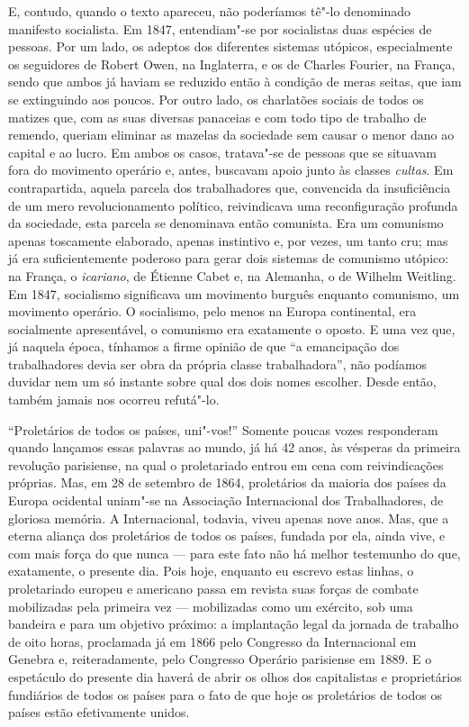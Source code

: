 E, contudo, quando o texto apareceu, não poderíamos tê"-lo denominado
manifesto socialista. Em 1847, entendiam"-se por socialistas duas
espécies de pessoas. Por um lado, os adeptos dos diferentes sistemas
utópicos, especialmente os seguidores de Robert Owen, na Inglaterra, e os
de Charles Fourier, na França, sendo que ambos já haviam se reduzido
então à condição de meras seitas, que iam se extinguindo aos poucos.
Por outro lado, os charlatões sociais de todos os matizes que, com as
suas diversas panaceias e com todo tipo de trabalho de remendo, queriam
eliminar as mazelas da sociedade sem causar o menor dano ao capital e
ao lucro. Em ambos os casos, tratava"-se de pessoas que se situavam
fora do movimento operário e, antes, buscavam apoio junto às classes
\textit{cultas}. Em contrapartida, aquela parcela dos trabalhadores que,
convencida da insuficiência de um mero revolucionamento político,
reivindicava uma reconfiguração profunda da sociedade, esta parcela se
denominava então comunista. Era um comunismo apenas toscamente
elaborado, apenas instintivo e, por vezes, um tanto cru; mas já era
suficientemente poderoso para gerar dois sistemas de comunismo utópico:
na França, o \textit{icariano}, de Étienne Cabet e, na Alemanha, o de Wilhelm
Weitling. Em 1847, socialismo significava um movimento burguês enquanto
comunismo, um movimento operário. O socialismo, pelo menos na Europa
continental, era socialmente apresentável, o comunismo era exatamente o
oposto. E uma vez que, já naquela época, tínhamos a firme opinião de
que ``a emancipação dos trabalhadores devia ser obra da própria classe
trabalhadora'', não podíamos duvidar nem um só instante sobre qual dos
dois nomes escolher. Desde então, também jamais nos ocorreu
refutá"-lo.

``Proletários de todos os países, uni"-vos!'' Somente poucas vozes
responderam quando lançamos essas palavras ao mundo, já há 42 anos, às vésperas da primeira revolução parisiense, na qual o
proletariado entrou em cena com reivindicações próprias. Mas, em 28 de
setembro de 1864, proletários da maioria dos países da Europa ocidental
uniam"-se na Associação Internacional dos Trabalhadores, de gloriosa
memória. A Internacional, todavia, viveu apenas nove anos. Mas, que a
eterna aliança dos proletários de todos os países, fundada por ela,
ainda vive, e com mais força do que nunca --- para este fato não há
melhor testemunho do que, exatamente, o presente dia. Pois hoje, enquanto
eu escrevo estas linhas, o proletariado europeu e americano passa em
revista suas forças de combate mobilizadas pela primeira vez ---
mobilizadas como um exército, sob uma bandeira e para um objetivo
próximo: a implantação legal da jornada de trabalho de oito horas,
proclamada já em 1866 pelo Congresso da Internacional em Genebra e,
reiteradamente, pelo Congresso Operário parisiense em 1889. E o
espetáculo do presente dia haverá de abrir os olhos dos capitalistas e
proprietários fundiários de todos os países para o fato de que hoje os
proletários de todos os países estão efetivamente unidos.

